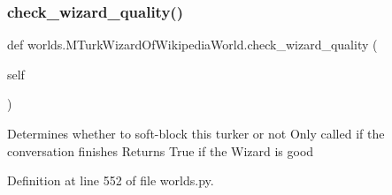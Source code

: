 \subsubsection{\texorpdfstring{check\+\_\+wizard\+\_\+quality()}{check\_wizard\_quality()}}
{\footnotesize\ttfamily def worlds.\+M\+Turk\+Wizard\+Of\+Wikipedia\+World.\+check\+\_\+wizard\+\_\+quality (\begin{DoxyParamCaption}\item[{}]{self }\end{DoxyParamCaption})}

\begin{DoxyVerb}Determines whether to soft-block this turker or not
   Only called if the conversation finishes
   Returns True if the Wizard is good
\end{DoxyVerb}
 

Definition at line 552 of file worlds.\+py.



